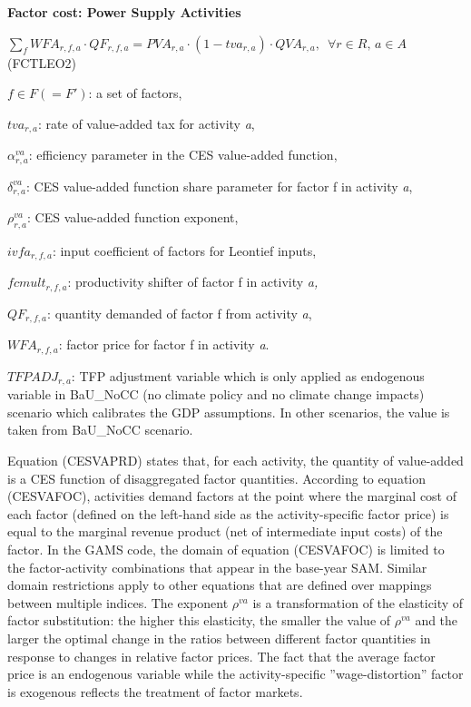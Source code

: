 \documentclass[10pt,a4paper,titlepage,dvipdfmx]{book}
\begin{document}
\begin{flushleft}\textbf{Factor cost: Power Supply Activities}\end{flushleft}


\begin{center}$\sum _{f}WFA_{r,f,a}\cdot QF_{r,f,a}=PVA_{r,a}\cdot \left(1-tva_{r,a}\right)\cdot QVA_{r,a},\,\,\,\forall r\in R,\,a\in A$ (FCTLEO2)
\end{center}

\begin{flushleft}
$f\in F\left(=F'\right)$: a set of factors,

$tva_{r,a}$: rate of value-added tax for activity \textit{a},

$\alpha _{r,a}^{va}$: efficiency parameter in the CES value-added function,

$\delta _{r,a}^{va}$: CES value-added function share parameter for factor f in activity \textit{a},

$\rho _{r,a}^{va}$: CES value-added function exponent,

$ivfa_{r,f,a}$: input coefficient of factors for Leontief inputs,

$fcmult_{r,f,a}$: productivity shifter of factor f in activity \textit{a,}

$QF_{r,f,a}$: quantity demanded of factor f from activity \textit{a},

$WFA_{r,f,a}$: factor price for factor f in activity \textit{a}.

$TFPADJ_{r,a}$: TFP adjustment variable which is only applied as endogenous variable in BaU\_NoCC (no climate policy and no climate change impacts) scenario which calibrates the GDP assumptions. In other scenarios, the value is taken from BaU\_NoCC scenario.
\end{flushleft}

Equation (CESVAPRD) states that, for each activity, the quantity of value-added is a CES function of disaggregated factor quantities. According to equation (CESVAFOC), activities demand factors at the point where the marginal cost of each factor (defined on the left-hand side as the activity-specific factor price) is equal to the marginal revenue product (net of intermediate input costs) of the factor. In the GAMS code, the domain of equation (CESVAFOC) is limited to the factor-activity combinations that appear in the base-year SAM. Similar domain restrictions apply to other equations that are defined over mappings between multiple indices. The exponent $\rho ^{va}$ is a transformation of the elasticity of factor substitution: the higher this elasticity, the smaller the value of $\rho ^{va}$ and the larger the optimal change in the ratios between different factor quantities in response to changes in relative factor prices. The fact that the average factor price is an endogenous variable while the activity-specific ''wage-distortion'' factor is exogenous reflects the treatment of factor markets.
\end{document}
